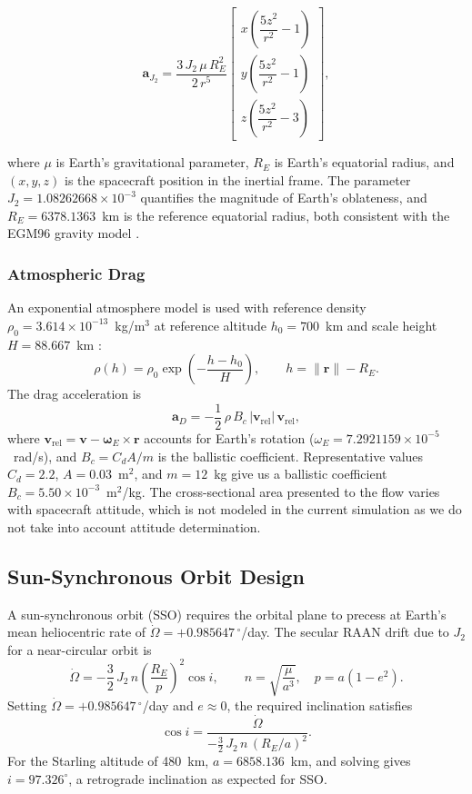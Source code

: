 \documentclass[12pt]{article}
\begin{document}
\[
\mathbf{a}_{J_2} = \frac{3\,J_2\,\mu\,R_E^2}{2\,r^5}
\begin{bmatrix}
x \!\left(\dfrac{5z^2}{r^2} - 1\right) \\[8pt]
y \!\left(\dfrac{5z^2}{r^2} - 1\right) \\[8pt]
z \!\left(\dfrac{5z^2}{r^2} - 3\right)
\end{bmatrix},
\]

where $\mu$ is Earth’s gravitational parameter, $R_E$ is Earth’s equatorial radius, and $(x,y,z)$ is the spacecraft position in the inertial frame. The parameter $J_2 = 1.08262668 \times 10^{-3}$ quantifies the magnitude of Earth's oblateness, and $R_E = 6378.1363$~km is the reference equatorial radius, both consistent with the EGM96 gravity model \cite{EGM96}. 

\subsubsection*{Atmospheric Drag}

An exponential atmosphere model is used with reference density
$\rho_0 = 3.614 \times 10^{-13}$~kg/m$^3$ at reference altitude $h_0 = 700$~km
and scale height $H = 88.667$~km \cite{Curtis2014}:
\[
\rho(h) = \rho_0 \exp\!\left(-\frac{h - h_0}{H}\right), \qquad h = \|\mathbf{r}\| - R_E.
\]
The drag acceleration is
\[
\mathbf{a}_D = -\frac{1}{2}\,\rho\,B_c\,|\mathbf{v}_{\mathrm{rel}}|\,\mathbf{v}_{\mathrm{rel}},
\]
where $\mathbf{v}_{\mathrm{rel}} = \mathbf{v} - \boldsymbol{\omega}_E \times \mathbf{r}$
accounts for Earth's rotation ($\omega_E = 7.2921159 \times 10^{-5}$~rad/s), and
$B_c = C_d A / m$ is the ballistic coefficient.
Representative values $C_d = 2.2$, $A = 0.03$~m$^2$, and $m = 12$~kg give us a ballistic coefficient
$B_c = 5.50 \times 10^{-3}$~m$^2$/kg.
The cross-sectional area presented to the flow varies with
spacecraft attitude, which is not modeled in the current simulation as we do not take into account attitude determination.

\subsection{Sun-Synchronous Orbit Design}

A sun-synchronous orbit (SSO) requires the orbital plane to precess at Earth's mean
heliocentric rate of $\dot\Omega = +0.985647\,^\circ$/day.
The secular RAAN drift due to $J_2$ for a near-circular orbit is \cite{Vallado2013}
\[
\dot\Omega = -\frac{3}{2}\,J_2\,n\left(\frac{R_E}{p}\right)^2\!\cos i,
\qquad n = \sqrt{\frac{\mu}{a^3}},\quad p = a(1-e^2).
\]
Setting $\dot\Omega = +0.985647\,^\circ$/day and $e \approx 0$, the required inclination satisfies
\[
\cos i = \frac{\dot\Omega}{-\tfrac{3}{2}\,J_2\,n\,(R_E/a)^2}.
\]
For the Starling altitude of 480~km, $a = 6858.136$~km, and solving gives
$i = 97.326^\circ$, a retrograde inclination as expected for SSO.
\end{document}

